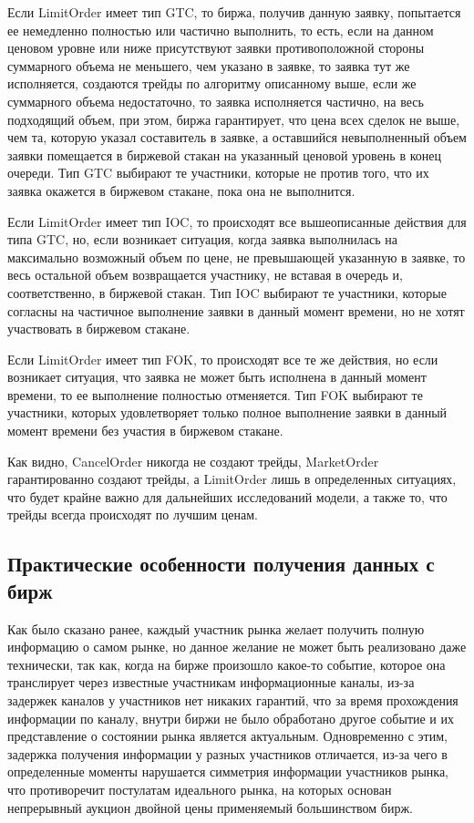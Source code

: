 \documentclass[12pt, a4paper]{article}
\begin{document}
Если LimitOrder имеет тип GTC, то биржа, получив данную заявку, попытается ее немедленно полностью или частично выполнить, то есть, если на данном ценовом уровне или ниже присутствуют заявки противоположной стороны суммарного объема не меньшего, чем указано в заявке, то заявка тут же исполняется, создаются трейды по алгоритму описанному выше, если же суммарного объема недостаточно, то заявка исполняется частично, на весь подходящий объем, при этом, биржа гарантирует, что цена всех сделок не выше, чем та, которую указал составитель в заявке, а оставшийся невыполненный объем заявки помещается в биржевой стакан на указанный ценовой уровень в конец очереди. Тип GTC выбирают те участники, которые не против того, что их заявка окажется в биржевом стакане, пока она не выполнится. 

Если LimitOrder имеет тип IOC, то происходят все вышеописанные действия для типа GTC, но, если возникает ситуация, когда заявка выполнилась на максимально возможный объем по цене, не превышающей указанную в заявке, то весь остальной объем возвращается участнику, не вставая в очередь и, соответственно, в биржевой стакан. Тип IOC выбирают те участники, которые согласны на частичное выполнение заявки в данный момент времени, но не хотят участвовать в биржевом стакане.

Если LimitOrder имеет тип FOK, то происходят все те же действия, но если возникает ситуация, что заявка не может быть исполнена в данный момент времени, то ее выполнение полностью отменяется. Тип FOK выбирают те участники, которых удовлетворяет только полное выполнение заявки в данный момент времени без участия в биржевом стакане.

Как видно, CancelOrder никогда не создают трейды, MarketOrder гарантированно создают трейды, а LimitOrder лишь в определенных ситуациях, что будет крайне важно для дальнейших исследований модели, а также то, что трейды всегда происходят по лучшим ценам.

\subsection{Практические особенности получения данных с бирж}

Как было сказано ранее, каждый участник рынка желает получить полную информацию о самом рынке, но данное желание не может быть реализовано даже технически, так как, когда на бирже произошло какое-то событие, которое она транслирует через известные участникам информационные каналы, из-за задержек каналов у участников нет никаких гарантий, что за время прохождения информации по каналу, внутри биржи не было обработано другое событие и их представление о состоянии рынка является актуальным. Одновременно с этим, задержка получения информации у разных участников отличается, из-за чего в определенные моменты нарушается симметрия информации участников рынка, что противоречит постулатам идеального рынка, на которых основан непрерывный аукцион двойной цены применяемый большинством бирж.
\end{document}
